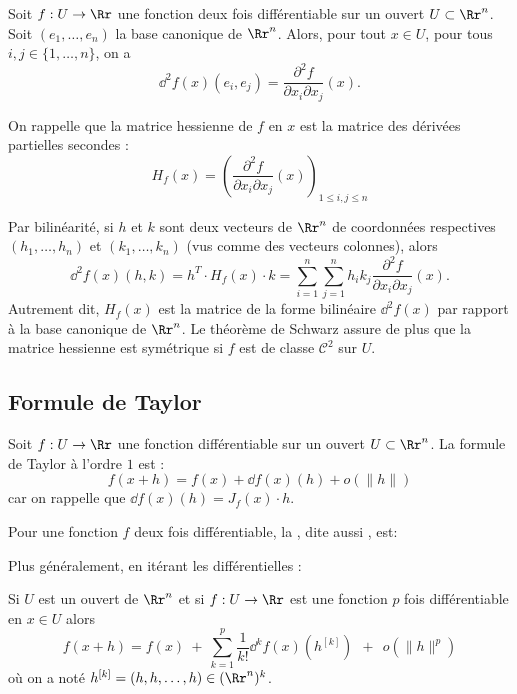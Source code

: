 \documentclass[11pt, class=report,crop=false]{standalone}
\begin{document}
\bigskip

Soit $f: U \to \Rr$ une fonction deux fois différentiable sur un ouvert $U \subset \Rr^n$.
Soit $(e_1,\ldots,e_n)$ la base canonique de $\Rr^n$.
Alors, pour tout $x \in U$, pour tous $i,j \in \{1,\ldots,n\}$, on a
$$\dd^2 f(x) (e_i,e_j) =\frac{\partial^2 f}{\partial x_i\partial x_j}(x).$$

On rappelle que la matrice hessienne de $f$ en $x$ est la matrice des dérivées partielles secondes :
$$H_f(x) = \left( \frac{\partial ^2f}{\partial x_i\partial x_j}(x) \right)_{1 \le i,j \le n}$$

Par bilinéarité, si $h$ et $k$ sont deux vecteurs de $\Rr^n$ de coordonnées respectives $(h_1,\ldots,h_n)$ et $(k_1,\ldots,k_n)$ (vus comme des vecteurs colonnes), alors
$$\dd^2 f (x) (h,k)= h^T \cdot  H_f(x) \cdot k 
= \sum_{i=1}^n \sum_{j=1}^n h_ik_j   \frac{\partial^2 f}{\partial x_i \partial x_j}(x).$$
Autrement dit, $H_f(x)$ est la matrice de la forme bilinéaire $\dd^2f(x)$ par rapport
à la base canonique de $\Rr^n$. Le théorème de Schwarz assure de plus que la matrice hessienne est symétrique si $f$ est de classe $\mathcal{C}^2$ sur $U$.


\subsection{Formule de Taylor}

Soit $f: U \to \Rr$ une fonction différentiable sur un ouvert $U \subset \Rr^n$.
La formule de Taylor à l'ordre $1$ est :
$$f(x+h) = f(x) + \dd f(x)(h) +  o\left(\|h\|\right)$$
car on rappelle que $\dd f(x) (h) = J_f(x) \cdot h$.

Pour une fonction $f$ deux fois différentiable, la , dite aussi , est:


Plus généralement, en itérant les différentielles :
\begin{theoreme}
Si $U$ est un ouvert de $\Rr^n$ et si $f: U \to \Rr$ est une fonction $p$ fois différentiable en $x \in U$ alors
$$
f(x+h) = f(x) \  + \  \sum_{k=1}^p{\dfrac{1}{k!} \dd^k f (x) (h^{[k]})} \ \  + \ \ o\left(\|h\|^p\right)
$$
où on a noté $h^{[k]} = (h,h,\ldots,h) \in (\Rr^n)^k$.
\end{theoreme}
\end{document}
